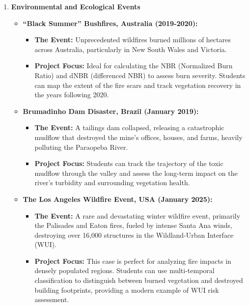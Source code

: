 \documentclass{article}
\begin{document}
\begin{enumerate}
    \item \textbf{Environmental and Ecological Events}
    \begin{itemize}
        \item \textbf{``Black Summer'' Bushfires, Australia (2019-2020):}
        \begin{itemize}
            \item \textbf{The Event:} Unprecedented wildfires burned millions of hectares across Australia, particularly in New South Wales and Victoria.
            \item \textbf{Project Focus:} Ideal for calculating the NBR (Normalized Burn Ratio) and dNBR (differenced NBR) to assess burn severity. Students can map the extent of the fire scars and track vegetation recovery in the years following 2020.
        \end{itemize}
        \item \textbf{Brumadinho Dam Disaster, Brazil (January 2019):}
        \begin{itemize}
            \item \textbf{The Event:} A tailings dam collapsed, releasing a catastrophic mudflow that destroyed the mine's offices, houses, and farms, heavily polluting the Paraopeba River.
            \item \textbf{Project Focus:} Students can track the trajectory of the toxic mudflow through the valley and assess the long-term impact on the river's turbidity and surrounding vegetation health.
        \end{itemize}
        \item \textbf{The Los Angeles Wildfire Event, USA (January 2025):}
        \begin{itemize}
            \item \textbf{The Event:} A rare and devastating winter wildfire event, primarily the Palisades and Eaton fires, fueled by intense Santa Ana winds, destroying over 16,000 structures in the Wildland-Urban Interface (WUI).
            \item \textbf{Project Focus:} This case is perfect for analyzing fire impacts in densely populated regions. Students can use multi-temporal classification to distinguish between burned vegetation and destroyed building footprints, providing a modern example of WUI risk assessment.
        \end{itemize}
    \end{itemize}


\end{enumerate}
\end{document}

